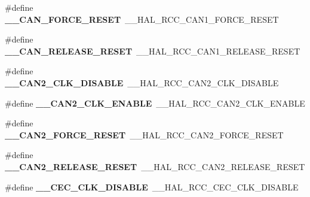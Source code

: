 \begin{DoxyCompactItemize}
\item 
\#define {\bfseries \+\_\+\+\_\+\+C\+A\+N\+\_\+\+F\+O\+R\+C\+E\+\_\+\+R\+E\+S\+ET}~\+\_\+\+\_\+\+H\+A\+L\+\_\+\+R\+C\+C\+\_\+\+C\+A\+N1\+\_\+\+F\+O\+R\+C\+E\+\_\+\+R\+E\+S\+ET\hypertarget{group___h_a_l___r_c_c___aliased_gaf5c34ac74804a9d5b5847ae0cc9a549a}{}\label{group___h_a_l___r_c_c___aliased_gaf5c34ac74804a9d5b5847ae0cc9a549a}

\item 
\#define {\bfseries \+\_\+\+\_\+\+C\+A\+N\+\_\+\+R\+E\+L\+E\+A\+S\+E\+\_\+\+R\+E\+S\+ET}~\+\_\+\+\_\+\+H\+A\+L\+\_\+\+R\+C\+C\+\_\+\+C\+A\+N1\+\_\+\+R\+E\+L\+E\+A\+S\+E\+\_\+\+R\+E\+S\+ET\hypertarget{group___h_a_l___r_c_c___aliased_gacc167159c85593d2ba0a5b90c693656b}{}\label{group___h_a_l___r_c_c___aliased_gacc167159c85593d2ba0a5b90c693656b}

\item 
\#define {\bfseries \+\_\+\+\_\+\+C\+A\+N2\+\_\+\+C\+L\+K\+\_\+\+D\+I\+S\+A\+B\+LE}~\+\_\+\+\_\+\+H\+A\+L\+\_\+\+R\+C\+C\+\_\+\+C\+A\+N2\+\_\+\+C\+L\+K\+\_\+\+D\+I\+S\+A\+B\+LE\hypertarget{group___h_a_l___r_c_c___aliased_ga0e19c4cf4794f8001f4b61cc23d330bb}{}\label{group___h_a_l___r_c_c___aliased_ga0e19c4cf4794f8001f4b61cc23d330bb}

\item 
\#define {\bfseries \+\_\+\+\_\+\+C\+A\+N2\+\_\+\+C\+L\+K\+\_\+\+E\+N\+A\+B\+LE}~\+\_\+\+\_\+\+H\+A\+L\+\_\+\+R\+C\+C\+\_\+\+C\+A\+N2\+\_\+\+C\+L\+K\+\_\+\+E\+N\+A\+B\+LE\hypertarget{group___h_a_l___r_c_c___aliased_gacd5af93932804a6d0daf1a57756a2624}{}\label{group___h_a_l___r_c_c___aliased_gacd5af93932804a6d0daf1a57756a2624}

\item 
\#define {\bfseries \+\_\+\+\_\+\+C\+A\+N2\+\_\+\+F\+O\+R\+C\+E\+\_\+\+R\+E\+S\+ET}~\+\_\+\+\_\+\+H\+A\+L\+\_\+\+R\+C\+C\+\_\+\+C\+A\+N2\+\_\+\+F\+O\+R\+C\+E\+\_\+\+R\+E\+S\+ET\hypertarget{group___h_a_l___r_c_c___aliased_ga0758ced4a5165755753da05edd59734c}{}\label{group___h_a_l___r_c_c___aliased_ga0758ced4a5165755753da05edd59734c}

\item 
\#define {\bfseries \+\_\+\+\_\+\+C\+A\+N2\+\_\+\+R\+E\+L\+E\+A\+S\+E\+\_\+\+R\+E\+S\+ET}~\+\_\+\+\_\+\+H\+A\+L\+\_\+\+R\+C\+C\+\_\+\+C\+A\+N2\+\_\+\+R\+E\+L\+E\+A\+S\+E\+\_\+\+R\+E\+S\+ET\hypertarget{group___h_a_l___r_c_c___aliased_ga9d24d2c5718973a68c2e6b523d0cd8cf}{}\label{group___h_a_l___r_c_c___aliased_ga9d24d2c5718973a68c2e6b523d0cd8cf}

\item 
\#define {\bfseries \+\_\+\+\_\+\+C\+E\+C\+\_\+\+C\+L\+K\+\_\+\+D\+I\+S\+A\+B\+LE}~\+\_\+\+\_\+\+H\+A\+L\+\_\+\+R\+C\+C\+\_\+\+C\+E\+C\+\_\+\+C\+L\+K\+\_\+\+D\+I\+S\+A\+B\+LE\hypertarget{group___h_a_l___r_c_c___aliased_gae6139fc836b41ec3314464257ac120b5}{}\label{group___h_a_l___r_c_c___aliased_gae6139fc836b41ec3314464257ac120b5}


\end{DoxyCompactItemize}
